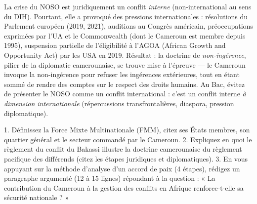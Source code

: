 \documentclass[11pt]{article}
\begin{document}
\begin{attention}
La crise du NOSO est juridiquement un conflit \emph{interne} (non-international au sens du DIH). Pourtant, elle a provoqué des pressions internationales : résolutions du Parlement européen (2019, 2021), auditions au Congrès américain, préoccupations exprimées par l'UA et le Commonwealth (dont le Cameroun est membre depuis 1995), suspension partielle de l'éligibilité à l'AGOA (African Growth and Opportunity Act) par les USA en 2019. Résultat : la doctrine de \emph{non-ingérence}, pilier de la diplomatie camerounaise, se trouve mise à l'épreuve — le Cameroun invoque la non-ingérence pour refuser les ingérences extérieures, tout en étant sommé de rendre des comptes sur le respect des droits humains. Au Bac, évitez de présenter le NOSO comme un conflit international : c'est un conflit interne \emph{à dimension internationale} (répercussions transfrontalières, diaspora, pression diplomatique).
\end{attention}

\begin{exercice}
1. Définissez la Force Mixte Multinationale (FMM), citez ses États membres, son quartier général et le secteur commandé par le Cameroun. 2. Expliquez en quoi le règlement du conflit du Bakassi illustre la doctrine camerounaise du règlement pacifique des différends (citez les étapes juridiques et diplomatiques). 3. En vous appuyant sur la méthode d'analyse d'un accord de paix (4 étapes), rédigez un paragraphe argumenté (12 à 15 lignes) répondant à la question : « La contribution du Cameroun à la gestion des conflits en Afrique renforce-t-elle sa sécurité nationale ? »
\end{exercice}
\end{document}

